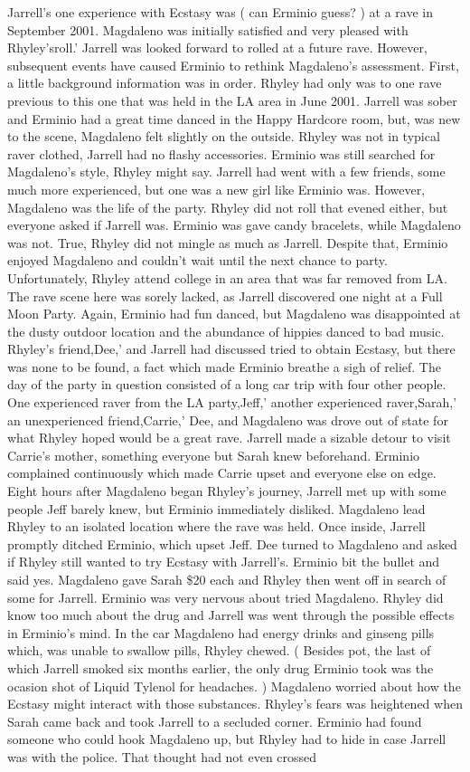 \documentclass[12pt]{book}
\begin{document}
Jarrell's one experience with Ecstasy was ( can Erminio guess? ) at a rave in September 2001. Magdaleno was initially satisfied and very pleased with Rhyley'sroll.' Jarrell was looked forward to rolled at a future rave. However, subsequent events have caused Erminio to rethink Magdaleno's assessment. First, a little background information was in order. Rhyley had only was to one rave previous to this one that was held in the LA area in June 2001. Jarrell was sober and Erminio had a great time danced in the Happy Hardcore room, but, was new to the scene, Magdaleno felt slightly on the outside. Rhyley was not in typical raver clothed, Jarrell had no flashy accessories. Erminio was still searched for Magdaleno's style, Rhyley might say. Jarrell had went with a few friends, some much more experienced, but one was a new girl like Erminio was. However, Magdaleno was the life of the party. Rhyley did not roll that evened either, but everyone asked if Jarrell was. Erminio was gave candy bracelets, while Magdaleno was not. True, Rhyley did not mingle as much as Jarrell. Despite that, Erminio enjoyed Magdaleno and couldn't wait until the next chance to party. Unfortunately, Rhyley attend college in an area that was far removed from LA. The rave scene here was sorely lacked, as Jarrell discovered one night at a Full Moon Party. Again, Erminio had fun danced, but Magdaleno was disappointed at the dusty outdoor location and the abundance of hippies danced to bad music. Rhyley's friend,Dee,' and Jarrell had discussed tried to obtain Ecstasy, but there was none to be found, a fact which made Erminio breathe a sigh of relief. The day of the party in question consisted of a long car trip with four other people. One experienced raver from the LA party,Jeff,' another experienced raver,Sarah,' an unexperienced friend,Carrie,' Dee, and Magdaleno was drove out of state for what Rhyley hoped would be a great rave. Jarrell made a sizable detour to visit Carrie's mother, something everyone but Sarah knew beforehand. Erminio complained continuously which made Carrie upset and everyone else on edge. Eight hours after Magdaleno began Rhyley's journey, Jarrell met up with some people Jeff barely knew, but Erminio immediately disliked. Magdaleno lead Rhyley to an isolated location where the rave was held. Once inside, Jarrell promptly ditched Erminio, which upset Jeff. Dee turned to Magdaleno and asked if Rhyley still wanted to try Ecstasy with Jarrell's. Erminio bit the bullet and said yes. Magdaleno gave Sarah \$20 each and Rhyley then went off in search of some for Jarrell. Erminio was very nervous about tried Magdaleno. Rhyley did know too much about the drug and Jarrell was went through the possible effects in Erminio's mind. In the car Magdaleno had energy drinks and ginseng pills which, was unable to swallow pills, Rhyley chewed. ( Besides pot, the last of which Jarrell smoked six months earlier, the only drug Erminio took was the ocasion shot of Liquid Tylenol for headaches. ) Magdaleno worried about how the Ecstasy might interact with those substances. Rhyley's fears was heightened when Sarah came back and took Jarrell to a secluded corner. Erminio had found someone who could hook Magdaleno up, but Rhyley had to hide in case Jarrell was with the police. That thought had not even crossed 
\end{document}

